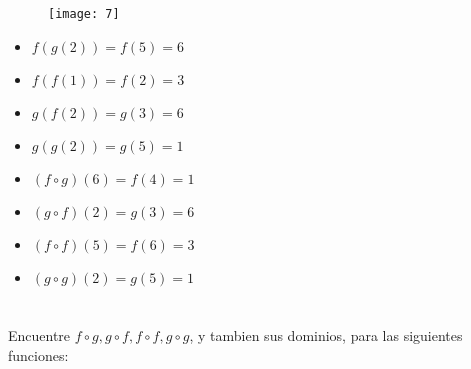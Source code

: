 \documentclass[journal,onecolumn,10pt,fleqn]{IEEEtran}%
\theoremstyle{break}                                            %
\begin{document}
\section{}

\begin{figure}[ht]
  \texttt{[image: 7]}
\end{figure}

\begin{itemize}
  \item $f(g(2)) = f(5) = 6$
  \item $f(f(1)) = f(2) = 3$
  \item $g(f(2)) = g(3) = 6$
  \item $g(g(2)) = g(5) = 1$
  \item $(f \circ g)(6) = f(4) = 1$
  \item $(g \circ f)(2) = g(3) = 6$
  \item $(f \circ f)(5) = f(6) = 3$
  \item $(g \circ g)(2) = g(5) = 1$
\end{itemize}

\section{}

Encuentre $f \circ g, g \circ f, f \circ f, g \circ g$, y tambien sus dominios, para las
siguientes funciones:
\end{document}
